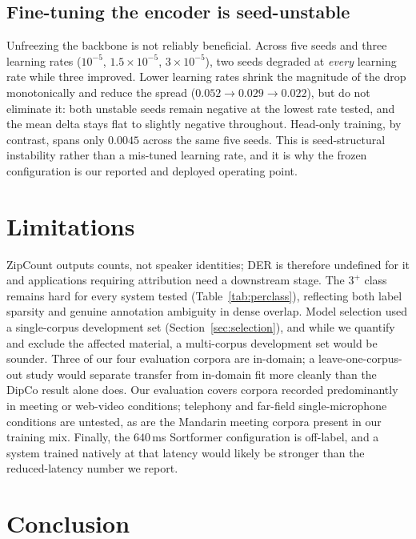 \documentclass[journal]{IEEEtran}
\newcommand{\sys}{ZipCount}
\begin{document}
\subsection{Fine-tuning the encoder is seed-unstable}
Unfreezing the backbone is not reliably beneficial. Across five seeds and
three learning rates ($10^{-5}$, $1.5\!\times\!10^{-5}$,
$3\!\times\!10^{-5}$), two seeds degraded at \emph{every} learning rate
while three improved. Lower learning rates shrink the magnitude of the drop
monotonically and reduce the spread ($0.052 \rightarrow 0.029 \rightarrow
0.022$), but do not eliminate it: both unstable seeds remain negative at the
lowest rate tested, and the mean delta stays flat to slightly negative
throughout. Head-only training, by contrast, spans only $0.0045$ across the
same five seeds. This is seed-structural instability rather than a mis-tuned
learning rate, and it is why the frozen configuration is our reported and
deployed operating point.

\section{Limitations}

\sys{} outputs counts, not speaker identities; DER is therefore undefined
for it and applications requiring attribution need a downstream stage. The
$3^{+}$ class remains hard for every system tested (Table~\ref{tab:perclass}),
reflecting both label sparsity and genuine annotation ambiguity in dense
overlap. Model selection used a single-corpus development set
(Section~\ref{sec:selection}), and while we quantify and exclude the
affected material, a multi-corpus development set would be sounder. Three of
our four evaluation corpora are in-domain; a leave-one-corpus-out study
would separate transfer from in-domain fit more cleanly than the DipCo
result alone does. Our evaluation covers corpora recorded predominantly in
meeting or web-video conditions; telephony and far-field single-microphone
conditions are untested, as are the Mandarin meeting corpora present in our
training mix. Finally, the $640$\,ms Sortformer configuration is off-label,
and a system trained natively at that latency would likely be stronger than
the reduced-latency number we report.

\section{Conclusion}
\end{document}
